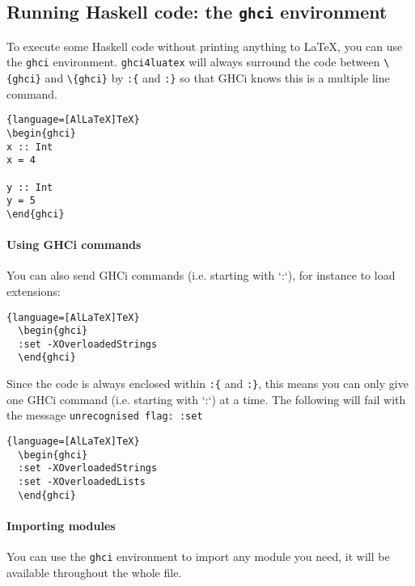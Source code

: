 \documentclass{article}
\begin{document}
\subsection{Running Haskell code: the \texttt{ghci} environment}

To execute some Haskell code without printing anything to LaTeX, you can use the \texttt{ghci} environment. \texttt{ghci4luatex} will always surround the code between \texttt{\textbackslash {}\{ghci\}} and  \texttt{\textbackslash {}\{ghci\}} by \texttt{:\{} and \texttt{:\}} so that GHCi knows this is a multiple line command.

\begin{latexbox}
\begin{lstlisting}{language=[AlLaTeX]TeX}
\begin{ghci}
x :: Int
x = 4

y :: Int
y = 5
\end{ghci}
\end{lstlisting}
\end{latexbox}

\paragraph{Using GHCi commands} You can also send GHCi commands (i.e. starting with `:`), for instance to load extensions:

  \begin{lstlisting}{language=[AlLaTeX]TeX}
  \begin{ghci}
  :set -XOverloadedStrings
  \end{ghci}
  \end{lstlisting}

\begin{warningbox}
  Since the code is always enclosed within \texttt{:\{} and \texttt{:\}}, this means you can only give one GHCi command (i.e. starting with `:`) at a time. The following will fail with the message \texttt{unrecognised flag: :set}
  \begin{lstlisting}{language=[AlLaTeX]TeX}
  \begin{ghci}
  :set -XOverloadedStrings
  :set -XOverloadedLists
  \end{ghci}
  \end{lstlisting}
\end{warningbox}


\paragraph{Importing modules}
You can use the \texttt{ghci} environment to import any module you need, it will be available throughout the whole file.
\end{document}

